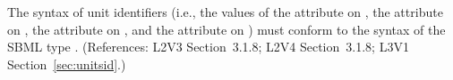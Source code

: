 The syntax of unit identifiers (i.e., the values of the 
attribute on \UnitDefinition, the  attribute on \Compartment,
the  attribute on \Parameter, and the 
attribute on \Species) must conform to the syntax of the SBML type
.  (References: L2V3 Section~3.1.8; L2V4 Section~3.1.8; 
L3V1 Section~\ref{sec:unitsid}.)
